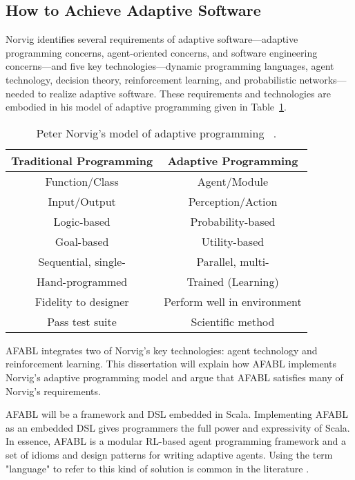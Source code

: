 \subsection{How to Achieve Adaptive Software}

Norvig identifies several requirements of adaptive soft\-ware---adaptive programming concerns, agent-oriented concerns, and software engineering concerns---and five key technologies---dynamic programming languages, agent technology, decision theory, reinforcement learning, and probabilistic networks---needed to realize adaptive software.  These requirements and technologies are embodied in his model of adaptive programming given in Table~\ref{tab:adaptive-model}.

\begin{table}[h]
\begin{tabular}{|c|c|}\hline
Traditional Programming & Adaptive Programming \\ \hline
Function/Class & Agent/Module \\
Input/Output & Perception/Action \\
Logic-based & Probability-based \\
Goal-based & Utility-based \\
Sequential, single- & Parallel, multi- \\
Hand-programmed & Trained (Learning) \\
Fidelity to designer & Perform well in environment \\
Pass test suite & Scientific method\\ \hline
\end{tabular}
\caption{Peter Norvig's model of adaptive programming
  ~\cite{norvig1998decision}.}
\label{tab:adaptive-model}
\end{table}

AFABL integrates two of Norvig's key technologies: agent technology and reinforcement learning.  This dissertation will explain how AFABL implements Norvig's adaptive programming model and argue that AFABL satisfies many of Norvig's requirements.

AFABL will be a framework and DSL embedded in Scala.  Implementing AFABL as an embedded DSL gives programmers the full power and expressivity of Scala.  In essence, AFABL is a modular RL-based agent programming framework and a set of idioms and design patterns for writing adaptive agents.  Using the term "language" to refer to this kind of solution is common in the literature \cite{andre2002state}.

